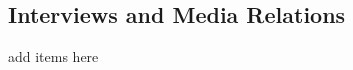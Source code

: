 
\subsection{Interviews and Media Relations}


\begin{packed_enum}
\item add items here
\end{packed_enum}


